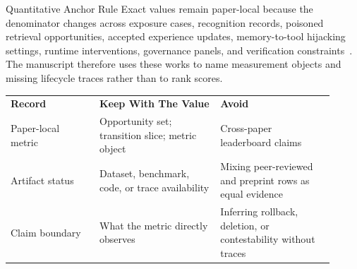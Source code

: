 \begin{SAVERTakeaway}{Quantitative Anchor Rule}
\label{takeaway:quantitative-anchor-rule} Exact values remain paper-local because the denominator changes across exposure cases, recognition records, poisoned retrieval opportunities, accepted experience updates, memory-to-tool hijacking settings, runtime interventions, governance panels, and verification constraints~\cite{debenedetti2024agentdojo,yuan2024rjudge,chen2024agentpoison,wang2026oep,zhang2026memmorph,liu_2026_safeagent_a_runtime_protecti,taheri2026governed_memory,banerjee2026severa}. The manuscript therefore uses these works to name measurement objects and missing lifecycle traces rather than to rank scores.

\vspace{3pt}
\begin{tabular}{@{}p{0.25\linewidth}p{0.34\linewidth}p{0.32\linewidth}@{}}
\rowcolor{saverNeutralHead}
\textbf{Record} & \textbf{Keep With The Value} & \textbf{Avoid} \\
Paper-local metric & Opportunity set; transition slice; metric object & Cross-paper leaderboard claims \\
Artifact status & Dataset, benchmark, code, or trace availability & Mixing peer-reviewed and preprint rows as equal evidence \\
Claim boundary & What the metric directly observes & Inferring rollback, deletion, or contestability without traces \\
\end{tabular}
\end{SAVERTakeaway}
